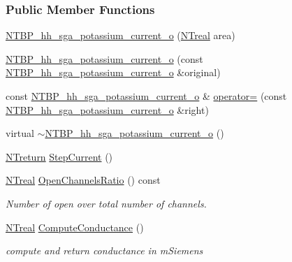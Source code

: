 \subsubsection*{Public Member Functions}
\begin{DoxyCompactItemize}
\item 
\hyperlink{class_n_t_b_p__hh__sga__potassium__current__o_afb82d07852588e5303fc9436178f7f81}{NTBP\_\-hh\_\-sga\_\-potassium\_\-current\_\-o} (\hyperlink{nt__types_8h_a814a97893e9deb1eedcc7604529ba80d}{NTreal} area)
\item 
\hyperlink{class_n_t_b_p__hh__sga__potassium__current__o_acd886b1974a15f9e542e90b9e9417d64}{NTBP\_\-hh\_\-sga\_\-potassium\_\-current\_\-o} (const \hyperlink{class_n_t_b_p__hh__sga__potassium__current__o}{NTBP\_\-hh\_\-sga\_\-potassium\_\-current\_\-o} \&original)
\item 
const \hyperlink{class_n_t_b_p__hh__sga__potassium__current__o}{NTBP\_\-hh\_\-sga\_\-potassium\_\-current\_\-o} \& \hyperlink{class_n_t_b_p__hh__sga__potassium__current__o_a1f79084df2650a18e5577d7a4aa7f366}{operator=} (const \hyperlink{class_n_t_b_p__hh__sga__potassium__current__o}{NTBP\_\-hh\_\-sga\_\-potassium\_\-current\_\-o} \&right)
\item 
virtual \hyperlink{class_n_t_b_p__hh__sga__potassium__current__o_abe3e26c3d30afa6dee8f79718acdb56e}{$\sim$NTBP\_\-hh\_\-sga\_\-potassium\_\-current\_\-o} ()
\item 
\hyperlink{nt__types_8h_ab9564ee8f091e809d21b8451c6683c53}{NTreturn} \hyperlink{class_n_t_b_p__hh__sga__potassium__current__o_a2aa5d4d6e88b999f94860eef904e7f03}{StepCurrent} ()
\item 
\hyperlink{nt__types_8h_a814a97893e9deb1eedcc7604529ba80d}{NTreal} \hyperlink{class_n_t_b_p__hh__sga__potassium__current__o_a603e2b01146a15b1a09ca4d9b057f1e6}{OpenChannelsRatio} () const 
\begin{DoxyCompactList}\small\item\em Number of open over total number of channels. \item\end{DoxyCompactList}\item 
\hyperlink{nt__types_8h_a814a97893e9deb1eedcc7604529ba80d}{NTreal} \hyperlink{class_n_t_b_p__hh__sga__potassium__current__o_aac9a78f4ba7cfa1c93e31735ac721fd3}{ComputeConductance} ()
\begin{DoxyCompactList}\small\item\em compute and return conductance in mSiemens \item\end{DoxyCompactList}\item 

\end{DoxyCompactItemize}
